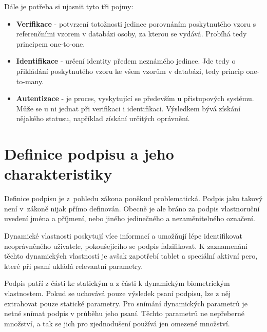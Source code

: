 Dále je potřeba si ujasnit tyto tři pojmy:
\begin{itemize}
  \item{\textbf{Verifikace} - potvrzení totožnosti jedince porovnáním poskytnutého vzoru s referenčními vzorem v databázi osoby,  %
  za kterou se vydává. Probíhá tedy principem one-to-one.}                                                                        %
  \item{\textbf{Identifikace} - určení identity předem neznámého jedince.                                                         %
  Jde tedy o přikládání poskytnutého vzoru ke všem vzorům v databázi, tedy princip one-to-many.}                                  %
  \item{\textbf{Autentizace} - je proces, vyskytující se především u přistupových systému.                                        %
  Může se u ni jednat při verifikaci i identifikaci.                                                                              %
  Výsledkem bývá získání nějakého statusu, například získání určitých oprávnění.}                                                 %
\end{itemize}


\section{Definice podpisu a jeho charakteristiky}
Definice podpisu je z~pohledu zákona poněkud problematická. 
Podpis jako takový není v~zákoně nijak přímo definován. 
Obecně je ale bráno za podpis vlastnoruční uvedení jména a příjmení, nebo jiného jedinečného a nezaměnitelného označení. %

Dynamické vlastnosti poskytují více informací a umožňují lépe identifikovat neoprávněného uživatele, pokoušejícího se podpis falzifikovat.    %
K zaznamenání těchto dynamických vlastností je avšak zapotřebí tablet a speciální aktivní pero, které při psaní ukládá relevantní parametry.  %

Podpis patří z části ke statickým a z části k dynamickým biometrickým vlastnostem.
Pokud se uchovává pouze výsledek psaní podpisu, lze z něj extrahovat pouze statické parametry.
Pro snímání dynamických parametrů je netné snímat podpis v průběhu jeho psaní.
Těchto parametrů ne nepřeberné množství, a tak se jich pro zjednodušení používá jen omezené množství.

